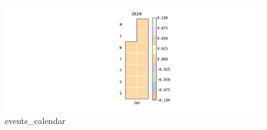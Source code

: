\documentclass{article}
\begin{document}
\begin{figure}[!htbp]
\centering
\includegraphics[width=0.01\linewidth]{files/events_calendar-1c52f0ad02e008e9966cfd99d8dda256.png}
\caption*{events\_calendar}
\end{figure}
\end{document}
